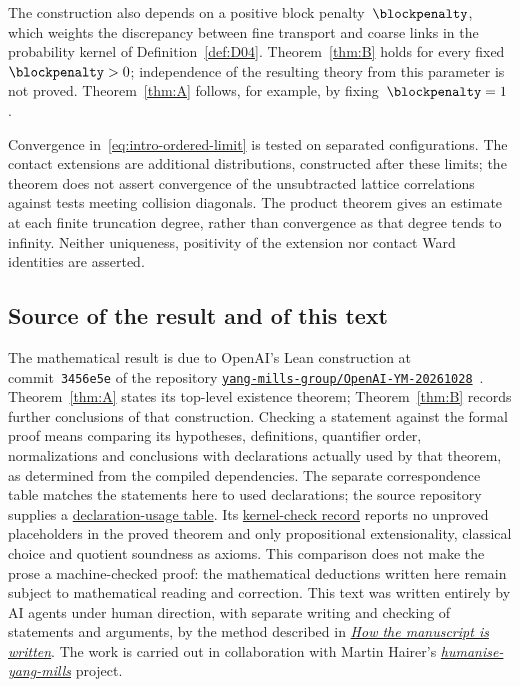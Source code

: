 The construction also depends on a positive block penalty~$\blockpenalty$, which weights the discrepancy between fine transport and coarse links in the probability kernel of Definition~\ref{def:D04}. Theorem~\ref{thm:B} holds for every fixed~$\blockpenalty>0$; independence of the resulting theory from this parameter is not proved. Theorem~\ref{thm:A} follows, for example, by fixing~$\blockpenalty=1$.

Convergence in~\eqref{eq:intro-ordered-limit} is tested on separated configurations. The contact extensions are additional distributions, constructed after these limits; the theorem does not assert convergence of the unsubtracted lattice correlations against tests meeting collision diagonals. The product theorem gives an estimate at each finite truncation degree, rather than convergence as that degree tends to infinity. Neither uniqueness, positivity of the extension nor contact Ward identities are asserted.

\subsection{Source of the result and of this text}\label{sec:intro-source}

The mathematical result is due to OpenAI's Lean construction at commit~\texttt{3456e5e} of the repository \href{https://github.com/yang-mills-group/OpenAI-YM-20261028}{\texttt{yang-mills-group/OpenAI-YM-20261028}}~\cite{OpenAI2026YM}. Theorem~\ref{thm:A} states its top-level existence theorem; Theorem~\ref{thm:B} records further conclusions of that construction. Checking a statement against the formal proof means comparing its hypotheses, definitions, quantifier order, normalizations and conclusions with declarations actually used by that theorem, as determined from the compiled dependencies. The separate correspondence table matches the statements here to used declarations; the source repository supplies a \href{https://github.com/yang-mills-group/OpenAI-YM-20261028/blob/3456e5e75cf8d4cd558955a5c7638fba2d68f464/verification/declaration-usage.tsv}{declaration-usage table}. Its \href{https://github.com/yang-mills-group/OpenAI-YM-20261028/blob/3456e5e75cf8d4cd558955a5c7638fba2d68f464/verification/joint-check.log}{kernel-check record} reports no unproved placeholders in the proved theorem and only propositional extensionality, classical choice and quotient soundness as axioms. This comparison does not make the prose a machine-checked proof: the mathematical deductions written here remain subject to mathematical reading and correction. This text was written entirely by AI agents under human direction, with separate writing and checking of statements and arguments, by the method described in \href{https://github.com/scottnarmstrong/yang-mills-informalization/blob/main/manuscript/PROCESS.md}{\emph{How the manuscript is written}}. The work is carried out in collaboration with Martin Hairer's \href{https://github.com/hairer/humanise-yang-mills}{\emph{humanise-yang-mills}} project.

